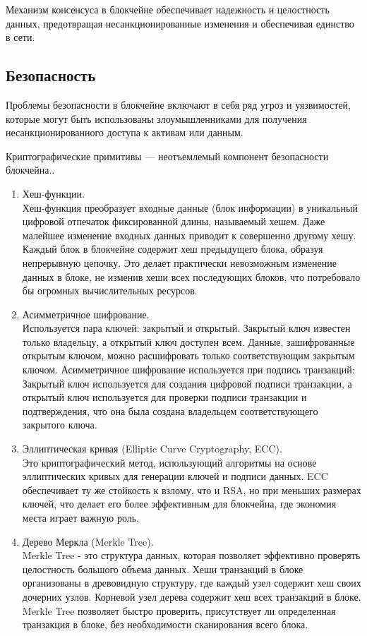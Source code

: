 Механизм консенсуса в блокчейне обеспечивает надежность и целостность данных, предотвращая несанкционированные изменения и обеспечивая единство в сети.

\subsection{Безопасность}

Проблемы безопасности в блокчейне включают в себя ряд угроз и уязвимостей, которые могут быть использованы злоумышленниками для получения несанкционированного доступа к активам или данным.

Криптографические примитивы — неотъемлемый компонент безопасности блокчейна..

\begin{enumerate}
	\item Хеш-функции.\\Хеш-функция преобразует входные данные (блок информации) в уникальный цифровой отпечаток фиксированной длины, называемый хешем. Даже малейшее изменение входных данных приводит к совершенно другому хешу. Каждый блок в блокчейне содержит хеш предыдущего блока, образуя непрерывную цепочку. Это делает практически невозможным изменение данных в блоке, не изменив хеши всех последующих блоков, что потребовало бы огромных вычислительных ресурсов.

	\item Асимметричное шифрование.\\Используется пара ключей: закрытый и открытый. Закрытый ключ известен только владельцу, а открытый ключ доступен всем. Данные, зашифрованные открытым ключом, можно расшифровать только соответствующим закрытым ключом. Асимметричное шифрование используется при подпись транзакций: Закрытый ключ используется для создания цифровой подписи транзакции, а открытый ключ используется для проверки подписи транзакции и подтверждения, что она была создана владельцем соответствующего закрытого ключа.

	\item Эллиптическая кривая (Elliptic Curve Cryptography, ECC).\\Это криптографический метод, использующий алгоритмы на основе эллиптических кривых для генерации ключей и подписи данных. ECC обеспечивает ту же стойкость к взлому, что и RSA, но при меньших размерах ключей, что делает его более эффективным для блокчейна, где экономия места играет важную роль.

	\item Дерево Меркла (Merkle Tree).\\ Merkle Tree - это структура данных, которая позволяет эффективно проверять целостность большого объема данных. Хеши транзакций в блоке организованы в древовидную структуру, где каждый узел содержит хеш своих дочерних узлов. Корневой узел дерева содержит хеш всех транзакций в блоке. Merkle Tree позволяет быстро проверить, присутствует ли определенная транзакция в блоке, без необходимости сканирования всего блока.


\end{enumerate}

